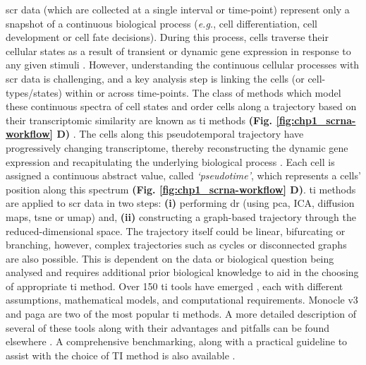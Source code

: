 \par \gls{scr} data (which are collected at a single interval or time-point) represent only a snapshot of a continuous biological process (\textit{e.g.}, cell differentiation, cell development or cell fate decisions). During this process, cells traverse their cellular states as a result of transient or dynamic gene expression in response to any given stimuli \textbf{\cite{zeng_what_2022}}. However, understanding the continuous cellular processes with \gls{scr} data is challenging, and a key analysis step is linking the cells (or cell-types/states) within or across time-points. The class of methods which model these continuous spectra of cell states and order cells along a trajectory based on their transcriptomic similarity are known as \gls{ti} methods \textbf{(Fig. \ref{fig:chp1_scrna-workflow} D)} \textbf{\cite{ weiler_guide_2022}}. The cells along this pseudotemporal trajectory have progressively changing transcriptome, thereby reconstructing the dynamic gene expression and recapitulating the underlying biological process \textbf{\cite{hou_statistical_2023}}. Each cell is assigned a continuous abstract value, called \textit{`pseudotime'}, which represents a cells’ position along this spectrum \textbf{(Fig. \ref{fig:chp1_scrna-workflow} D)}.
\gls{ti} methods are applied to \gls{scr} data in two steps: \textbf{(i)} performing \gls{dr} (using \gls{pca}, ICA, diffusion maps, \gls{tsne} or \gls{umap}) and, \textbf{(ii)} constructing a graph-based trajectory through the reduced-dimensional space. The trajectory itself could be linear, bifurcating or branching, however, complex trajectories such as cycles or disconnected graphs are also possible. This is dependent on the data or biological question being analysed and requires additional prior biological knowledge to aid in the choosing of appropriate \gls{ti} method. Over 150 \gls{ti} tools have emerged \textbf{\cite{noauthor_scrna-tools_nodate,zappia_exploring_2018}}, each with different assumptions, mathematical models, and computational requirements. Monocle v3 \textbf{\cite{cao_single-cell_2019}} and \gls{paga} \textbf{\cite{wolf_paga_2019}} are two of the most popular \gls{ti} methods. A more detailed description of several of these tools along with their advantages and pitfalls can be found elsewhere \textbf{\cite{ding_temporal_2022,deconinck_recent_2021,cannoodt_computational_2016,saelens_comparison_2019}}. A comprehensive benchmarking, along with a practical guideline to assist with the choice of TI method is also available \textbf{\cite{saelens_comparison_2019}}. %

